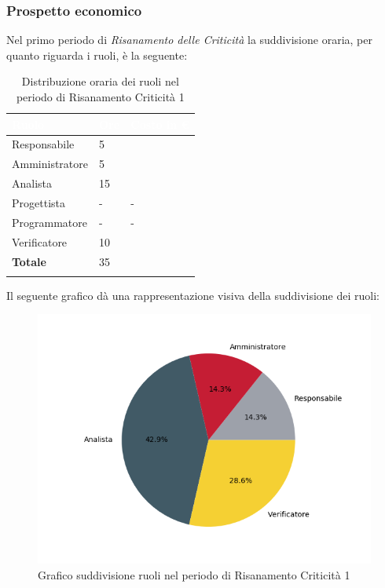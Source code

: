 \subsubsection{Prospetto economico}
Nel primo periodo di \textit{Risanamento delle Criticità} la suddivisione oraria, per quanto riguarda i ruoli, è la seguente: 


\begin{longtable}{| C{.30\textwidth}| C{.15\textwidth}| C{.20\textwidth}|}
\hline
{}\textbf{\textcolor{white}{Ruolo}} & \textbf{\textcolor{white}{Ore}} & \textbf{\textcolor{white}{Costo in \euro}} \\
\hline 
Responsabile & 5 &  \\
\hline
{}Amministratore & 5 &  \\
\hline
Analista & 15 &  \\
\hline
{}Progettista & - & - \\
\hline
Programmatore & - & - \\
\hline
{}Verificatore & 10 & \\
\hline
\textbf{Totale} & 35 &  \\
\hline


\caption{Distribuzione oraria dei ruoli nel periodo di Risanamento Criticità 1}
\label{Distribuzione oraria ruoli del periodo di rc1}
\end{longtable}

Il seguente grafico dà una rappresentazione visiva della suddivisione dei ruoli:
\begin{figure}[H]
	\centering
  		\includegraphics[width=1\linewidth]{./images/torta_rc1.png}
  		\caption{Grafico suddivisione ruoli nel periodo di Risanamento Criticità 1}
  		\label{fig:grafico suddivione ruoli periodo di rc1}
\end{figure}

